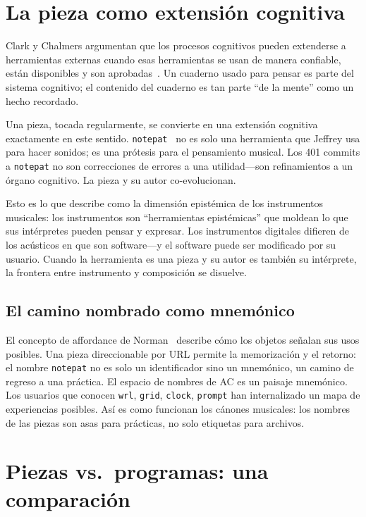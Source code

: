 \documentclass[10pt,letterpaper,twocolumn]{article}
\begin{document}
\section{La pieza como extensión cognitiva}

Clark y Chalmers argumentan que los procesos cognitivos pueden extenderse a herramientas externas cuando esas herramientas se usan de manera confiable, están disponibles y son aprobadas~\citep{clark1998extended}. Un cuaderno usado para pensar es parte del sistema cognitivo; el contenido del cuaderno es tan parte ``de la mente'' como un hecho recordado.

Una pieza, tocada regularmente, se convierte en una extensión cognitiva exactamente en este sentido. \texttt{notepat}~\citep{scudder2026notepat} no es solo una herramienta que Jeffrey usa para hacer sonidos; es una prótesis para el pensamiento musical. Los 401 commits a \texttt{notepat} no son correcciones de errores a una utilidad---son refinamientos a un órgano cognitivo. La pieza y su autor co-evolucionan.

Esto es lo que \citet{magnusson2010designing} describe como la dimensión epistémica de los instrumentos musicales: los instrumentos son ``herramientas epistémicas'' que moldean lo que sus intérpretes pueden pensar y expresar. Los instrumentos digitales difieren de los acústicos en que son software---y el software puede ser modificado por su usuario. Cuando la herramienta es una pieza y su autor es también su intérprete, la frontera entre instrumento y composición se disuelve.

\subsection{El camino nombrado como mnemónico}

El concepto de affordance de Norman~\citep{norman1988design} describe cómo los objetos señalan sus usos posibles. Una pieza direccionable por URL permite la memorización y el retorno: el nombre \texttt{notepat} no es solo un identificador sino un mnemónico, un camino de regreso a una práctica. El espacio de nombres de AC es un paisaje mnemónico. Los usuarios que conocen \texttt{wrl}, \texttt{grid}, \texttt{clock}, \texttt{prompt} han internalizado un mapa de experiencias posibles. Así es como funcionan los cánones musicales: los nombres de las piezas son asas para prácticas, no solo etiquetas para archivos.

\section{Piezas vs.\ programas: una comparación}
\end{document}
